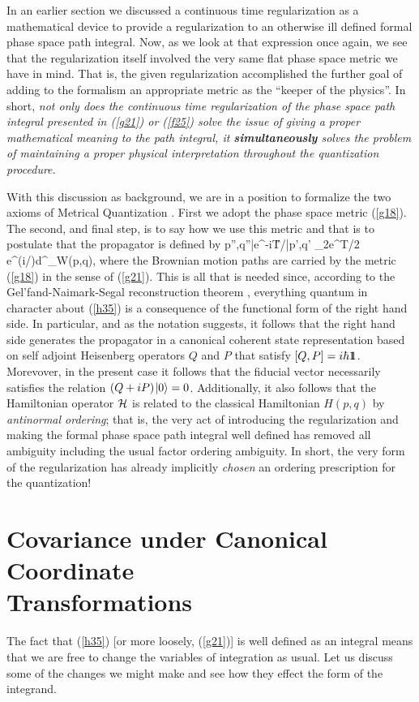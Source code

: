 In an earlier section we discussed a continuous time regularization as a 
mathematical device to provide a regularization to an otherwise ill 
defined formal phase space path integral. Now, as we look at that 
expression once again, we see that the regularization itself involved the 
very same flat phase space metric we have in mind. That is, the given 
regularization accomplished the further goal of adding to the formalism an 
appropriate metric as the ``keeper of the physics''. In short, {\it not 
only does the continuous time regularization of the phase space path 
integral presented in (\ref{g21}) or (\ref{f25}) solve the issue of giving 
a proper mathematical meaning to the path integral, it {\bf simultaneously} 
solves the problem of maintaining a proper physical interpretation 
throughout the quantization procedure.} 

With this discussion as background, we are in a position to formalize the 
two axioms of Metrical Quantization \cite{swe}. First we adopt the phase 
space metric (\ref{g18}). The second, and final step, is to say how we 
use this metric and that is to postulate that the propagator is defined by 
  \bn \<p'',q''|\s e^{-i\H T/\hbar}\s|p',q'\>\equiv
\lim_{\nu\ra\infty}2\pi\s e^{\nu T/2\hbar}\int 
e^{(i/\hbar)\tint[p\s dq-H(p,q)\s dt]}\;d\mu^\nu_W(p,q)\;, \label{h35}\en
where the Brownian motion paths are carried by the metric (\ref{g18}) in 
the sense of (\ref{g21}).
This is all that is needed since, according to the Gel'fand-Naimark-Segal 
reconstruction theorem \cite{emch}, everything quantum in character about 
(\ref{h35}) is a consequence of the functional form of the right hand side. 
In particular, and as the notation suggests, it follows that the right hand 
side generates the propagator in a canonical coherent state representation 
based on self adjoint Heisenberg operators $Q$ and $P$ that satisfy 
$[Q,P]=i\hbar1\hskip-.37em 1$. Morevover, in the present case it follows that the 
fiducial vector necessarily satisfies the relation $(Q+iP)\hskip.08em|0\rangle=0$. 
Additionally, it also follows that the Hamiltonian operator ${\cal H}$ is 
related to the classical Hamiltonian $H(p,q)$ by 
{\it antinormal ordering\/}; that is, the very act of introducing the 
regularization and making the formal phase space path integral well 
defined has removed all ambiguity including the usual factor ordering 
ambiguity. In short, the very form of the regularization has already 
implicitly {\it chosen} an ordering prescription for the quantization!

\section{Covariance under Canonical Coordinate \\Transformations}
The fact that (\ref{h35}) [or more loosely, (\ref{g21})] is well defined 
as an integral means that we are free to change the variables of 
integration as usual. Let us discuss some of the changes we might make 
and see how they effect the form of the integrand. 

